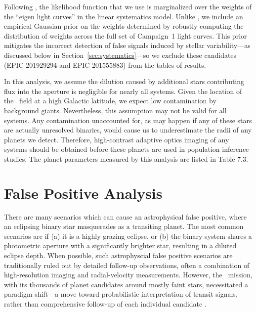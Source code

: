 Following \paperit, the likelihood function that we use is marginalized over
the weights of the ``eigen light curves'' in the linear systematics model.
Unlike \paperit, we include an empirical Gaussian prior on the weights
determined by robustly computing the distribution of weights across the full
set of Campaign~1 light curves.
This prior mitigates the incorrect detection of false signals induced by
stellar variability---as discussed below in Section~\ref{sec:systematics}---so
we exclude these candidates (EPIC 201929294 and EPIC 201555883) from the tables
of results.


In this analysis, we assume the dilution caused by additional stars
contributing flux into the aperture is negligible for nearly all systems.
Given the location of the \Ci\ field at a high Galactic latitude, we expect
low contamination by background giants.
Nevertheless, this assumption may not be valid for all systems.
Any contamination unaccounted for, as may happen if any of these stars are
actually unresolved binaries, would cause us to underestimate the radii of any
planets we detect.
Therefore, high-contrast adaptive optics imaging of any systems should be
obtained before these planets are used in population inference studies.
The planet parameters measured by this analysis are listed in Table 7.3.



\section{False Positive Analysis}


There are many scenarios which can cause an astrophysical false positive,
where an eclipsing binary star masquerades as a transiting planet.
The most common scenarios are if (a) it is a highly grazing eclipse, or (b) the binary system
shares a photometric aperture with a significantly brighter star,
resulting in a diluted eclipse depth.
When possible, such astrophyscial false positive scenarios are traditionally
ruled out by detailed follow-up observations, often a combination of
high-resolution imaging and radial-velocity measurements.
However, the \kep\ mission, with its thousands of planet candidates
around mostly faint stars, necessitated a paradigm shift---a move
toward probabilistic interpretation of transit signals, rather than
comprehensive follow-up of each individual candidate \citep{Morton11b}.

